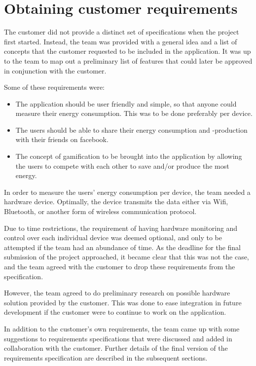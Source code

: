 \section{Obtaining customer requirements}
\label{sec:obtainingreq}

The customer did not provide a distinct set of specifications when the project first started. Instead, the team was provided with a general idea and a list of concepts that the customer requested to be included in the application. It was up to the team to map out a preliminary list of features that could later be approved in conjunction with the customer. 

Some of these requirements were:
\begin{itemize}
\item The application should be user friendly and simple, so that anyone could measure their energy consumption. This was to be done preferably per device. 
\item The users should be able to share their energy consumption and -production with their friends on \gls{facebook}. 
\item The concept of \gls{gamification} to be brought into the application by allowing the users to compete with each other to save and/or produce the most energy. 
\end{itemize}

In order to measure the users' energy consumption per device, the team needed a hardware device. Optimally, the device transmits the data either via Wifi, Bluetooth, or another form of wireless communication protocol.

Due to time restrictions, the requirement of having hardware monitoring and control over each individual device was deemed optional, and only to be attempted if the team had an abundance of time. As the deadline for the final submission of the project approached, it became clear that this was not the case, and the team agreed with the customer to drop these requirements from the specification. 

However, the team agreed to do preliminary research on possible hardware solution provided by the customer. This was done to ease integration in future development if the customer were to continue to work on the application.

In addition to the customer's own requirements, the team came up with some suggestions to requirements specifications that were discussed and added in collaboration with the customer. Further details of the final version of the requirements specification are described in the subsequent sections.